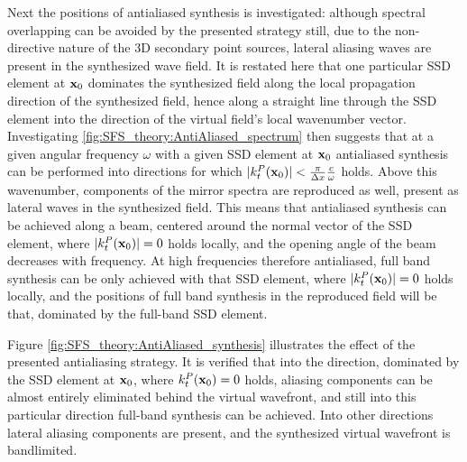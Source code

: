Next the positions of antialiased synthesis is investigated: although spectral overlapping can be avoided by the presented strategy still, due to the non-directive nature of the 3D secondary point sources, lateral aliasing waves are present in the synthesized wave field.
It is restated here that one particular SSD element at $\mathbf{x}_0$ dominates the synthesized field along the local propagation direction of the synthesized field, hence along a straight line through the SSD element into the direction of the virtual field's local wavenumber vector.
Investigating \ref{fig:SFS_theory:AntiAliased_spectrum} then suggests that at a given angular frequency $\omega$ with a given SSD element at $\mathbf{x}_0$ antialiased synthesis can be performed into directions for which $|k^P_t(\mathbf{x}_0)| < \frac{\pi}{\Delta x} \frac{c}{\omega}$ holds.
Above this wavenumber, components of the mirror spectra are reproduced as well, present as lateral waves in the synthesized field. 
This means that antialiased synthesis can be achieved along a beam, centered around the normal vector of the SSD element, where $|k^P_t(\mathbf{x}_0)| = 0$ holds locally, and the opening angle of the beam decreases with frequency.
At high frequencies therefore antialiased, full band synthesis can be only achieved with that SSD element, where $|k^P_t(\mathbf{x}_0)| = 0$ holds locally, and the positions of full band synthesis in the reproduced field will be that, dominated by the full-band SSD element.

Figure \ref{fig:SFS_theory:AntiAliased_synthesis} illustrates the effect of the presented antialiasing strategy.
It is verified that into  the direction, dominated by the SSD element at $\mathbf{x}_0$, where $k^P_t(\mathbf{x}_0) = 0$ holds, aliasing components can be almost entirely eliminated behind the virtual wavefront, and still into this particular direction full-band synthesis can be achieved.
Into other directions lateral aliasing components are present, and the synthesized virtual wavefront is bandlimited.

